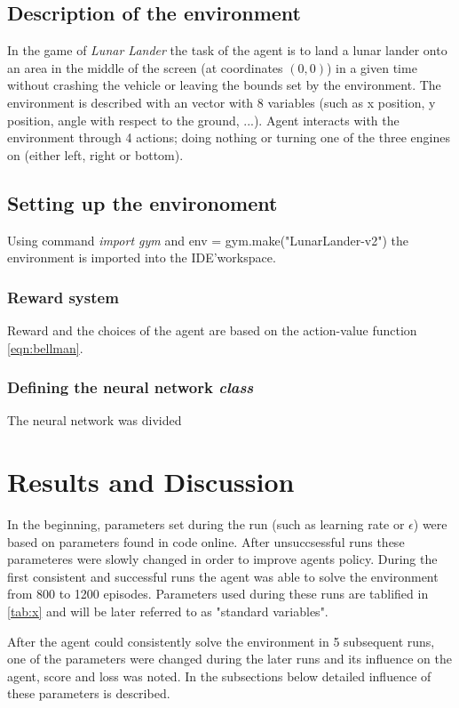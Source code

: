 \documentclass{article}
\begin{document}
\subsection{Description of the environment}
In the game of \textit{Lunar Lander} the task of the agent is to land a lunar lander onto an area in the middle of the screen (at coordinates $(0,0)$) in a given time without crashing the vehicle or leaving the bounds set by the environment. The environment is described with an vector with 8 variables (such as x position, y position, angle with respect to the ground, ...). Agent interacts with the environment through 4 actions; doing nothing or turning one of the three engines on (either left, right or bottom).

\subsection{Setting up the environoment}
Using command \textit{import gym} and env = gym.make("LunarLander-v2") the environment is imported into the IDE'\footnotemark \space workspace.

\subsubsection{Reward system}
Reward and the choices of the agent are based on the action-value function \ref{eqn:bellman}.

\subsubsection{Defining the neural network \textit{class}}
The neural network was divided

\newpage
\section*{Results and Discussion}
In the beginning, parameters set during the run (such as learning rate or $\epsilon$) were based on parameters found in code online. After unsuccsessful runs these parameteres were slowly changed in order to improve agents policy. During the first consistent and successful runs the agent was able to solve the environment from 800 to 1200 episodes. Parameters used during these runs are tablified in \ref{tab:x} and will be later referred to as "standard variables".

After the agent could consistently solve the environment in 5 subsequent runs, one of the parameters were changed during the later runs and its influence on the agent, score and loss was noted. In the subsections below detailed influence of these parameters is described.
\end{document}
